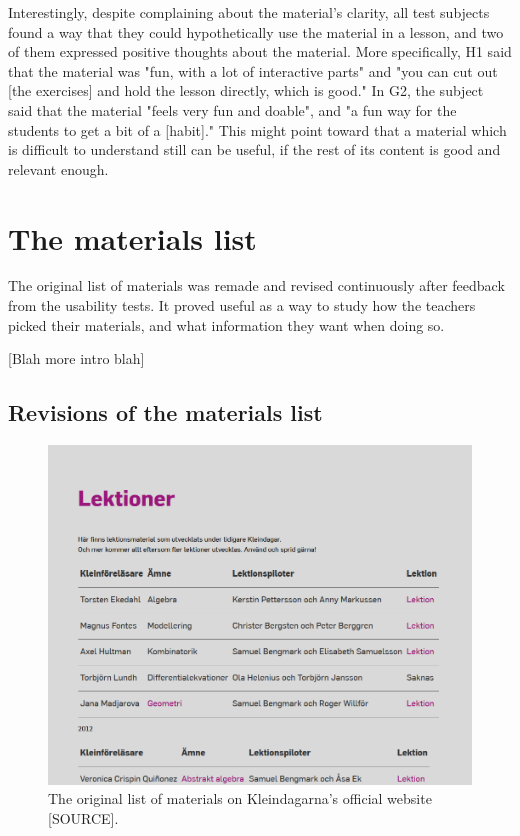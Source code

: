 Interestingly, despite complaining about the material's clarity, all test subjects found a way that they could hypothetically use the material in a lesson, and two of them expressed positive thoughts about the material. More specifically, H1 said that the material was "fun, with a lot of interactive parts" and "you can cut out [the exercises] and hold the lesson directly, which is good." In G2, the subject said that the material "feels very fun and doable", and "a fun way for the students to get a bit of a [habit]." This might point toward that a material which is difficult to understand still can be useful, if the rest of its content is good and relevant enough.

\section{The materials list}

The original list of materials was remade and revised continuously after feedback from the usability tests. It proved useful as a way to study how the teachers picked their materials, and what information they want when doing so.

[Blah more intro blah]

\subsection{Revisions of the materials list}

\begin{figure}[H]
\centering
\includegraphics[width=\linewidth]{figure/screenshot_materiallista_kleindagarna.png}
\caption{The original list of materials on Kleindagarna's official website [SOURCE].}
\end{figure}

